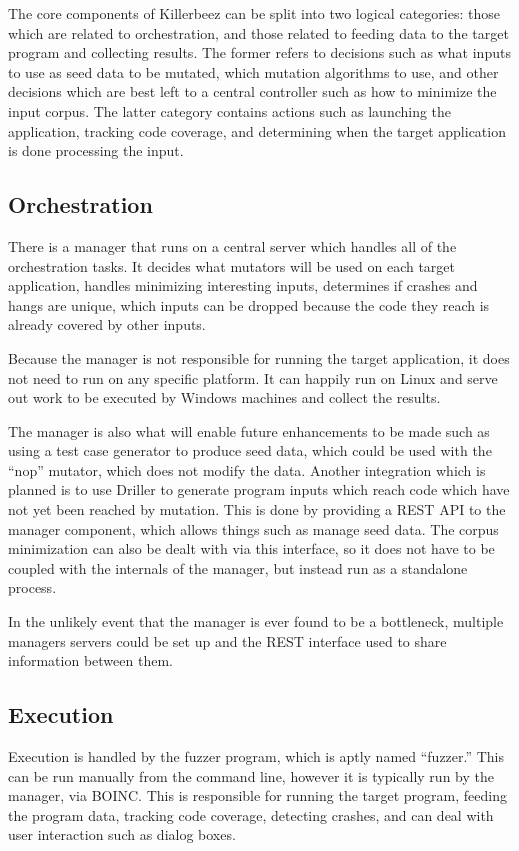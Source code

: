 The core components of Killerbeez can be split into two logical categories:
those which are related to orchestration, and those related to feeding data
to the target program and collecting results.  The former refers to decisions
such as what inputs to use as seed data to be mutated, which mutation
algorithms to use, and other decisions which are best left to a central
controller such as how to minimize the input corpus.  The latter category
contains actions such as launching the application, tracking code coverage,
and determining when the target application is done processing the input.

\subsection{Orchestration}
There is a manager that runs on a central server which handles all of the
orchestration tasks.  It decides what mutators will be used on each target
application, handles minimizing interesting inputs, determines if crashes
and hangs are unique, which inputs can be dropped because the code they
reach is already covered by other inputs.

Because the manager is not responsible for running the target application, it
does not need to run on any specific platform.  It can happily run on Linux and
serve out work to be executed by Windows machines and collect the results.

The manager is also what will enable future enhancements to be made such as
using a test case generator to produce seed data, which could be used with the
``nop'' mutator, which does not modify the data. Another integration which is
planned is to use Driller\cite{driller} to generate program inputs which reach
code which have not yet been reached by mutation. This is done by providing a
REST API to the manager component, which allows things such as manage seed
data. The corpus minimization can also be dealt with via this interface, so
it does not have to be coupled with the internals of the manager, but instead
run as a standalone process.

In the unlikely event that the manager is ever found to be a bottleneck,
multiple managers servers could be set up and the REST interface used to share
information between them.

\subsection{Execution}
Execution is handled by the fuzzer program, which is aptly named ``fuzzer.''
This can be run manually from the command line, however it is typically run by
the manager, via BOINC.  This is responsible for running the target program,
feeding the program data, tracking code coverage, detecting crashes, and can
deal with user interaction such as dialog boxes.

